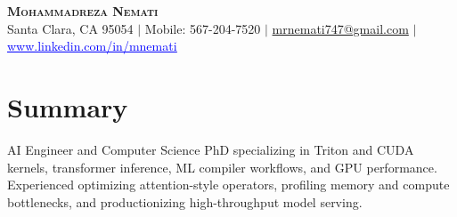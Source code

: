 \documentclass[letterpaper,13pt]{article}
\begin{document}
\begin{center}
    \textbf{\LARGE \scshape Mohammadreza Nemati} \\ \vspace{1pt}
    \small Santa Clara, CA 95054 $|$ Mobile: 567-204-7520 $|$
    \href{mailto:mrnemati747@gmail.com}{mrnemati747@gmail.com} $|$
    \href{https://www.linkedin.com/in/mnemati/}{\textcolor{blue}{\underline{www.linkedin.com/in/mnemati}}}
\end{center}

\section{Summary}
\small{AI Engineer and Computer Science PhD specializing in Triton and CUDA kernels, transformer inference, ML compiler workflows, and GPU performance. Experienced optimizing attention-style operators, profiling memory and compute bottlenecks, and productionizing high-throughput model serving.}
\vspace{0.05cm}
\end{document}
